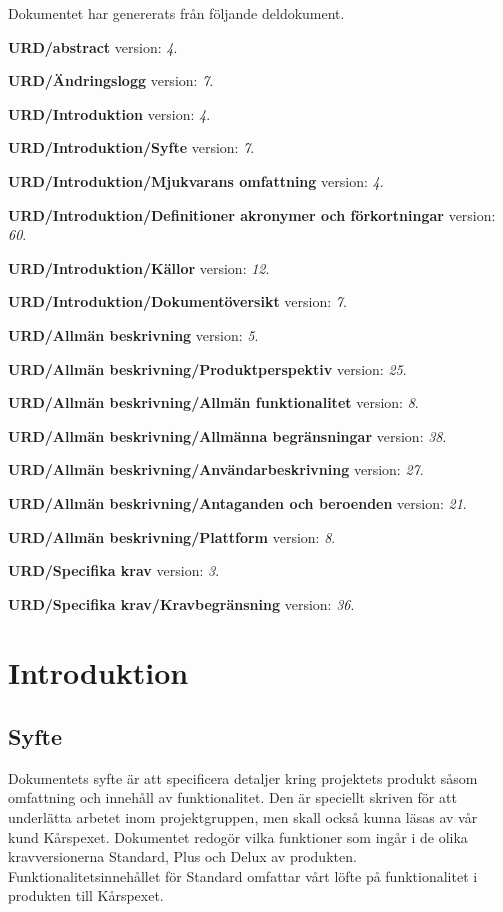 \documentclass[a4paper, twoside, 11pt, titlepage]{article}
\begin{document}
Dokumentet har genererats från följande deldokument.

\textbf{URD/abstract} version: \emph{4}.

\textbf{URD/Ändringslogg} version: \emph{7}.

\textbf{URD/Introduktion} version: \emph{4}.

\textbf{URD/Introduktion/Syfte} version: \emph{7}.

\textbf{URD/Introduktion/Mjukvarans omfattning} version: \emph{4}.

\textbf{URD/Introduktion/Definitioner akronymer och förkortningar} version: \emph{60}.

\textbf{URD/Introduktion/Källor} version: \emph{12}.

\textbf{URD/Introduktion/Dokumentöversikt} version: \emph{7}.

\textbf{URD/Allmän beskrivning} version: \emph{5}.

\textbf{URD/Allmän beskrivning/Produktperspektiv} version: \emph{25}.

\textbf{URD/Allmän beskrivning/Allmän funktionalitet} version: \emph{8}.

\textbf{URD/Allmän beskrivning/Allmänna begränsningar} version: \emph{38}.

\textbf{URD/Allmän beskrivning/Användarbeskrivning} version: \emph{27}.

\textbf{URD/Allmän beskrivning/Antaganden och beroenden} version: \emph{21}.

\textbf{URD/Allmän beskrivning/Plattform} version: \emph{8}.

\textbf{URD/Specifika krav} version: \emph{3}.

\textbf{URD/Specifika krav/Kravbegränsning} version: \emph{36}.

\clearpage
\section{Introduktion}



	\subsection{Syfte}


	Dokumentets syfte är att specificera detaljer kring projektets produkt såsom omfattning och innehåll av funktionalitet. Den är speciellt skriven för att underlätta arbetet inom projektgruppen, men skall också kunna läsas av vår kund Kårspexet. Dokumentet redogör vilka funktioner som ingår i de olika kravversionerna Standard, Plus och Delux av produkten. Funktionalitetsinnehållet för Standard omfattar vårt löfte på funktionalitet i produkten till Kårspexet.
\end{document}

